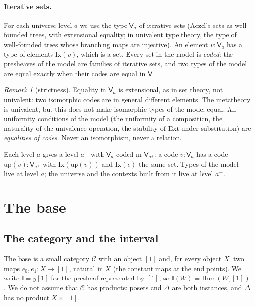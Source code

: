 \documentclass[11pt]{article}
\newcommand{\Hom}{\mathrm{Hom}}
\newcommand{\I}{\mathbb{I}}
\newcommand{\C}{\mathcal{C}}
\newcommand{\V}{\mathsf{V}}
\newcommand{\Ext}{\mathrm{Ext}}
\newcommand{\up}{\mathrm{up}}
\theoremstyle{plain}
\theoremstyle{definition}
\theoremstyle{remark}
\newtheorem{remark}[theorem]{Remark}
\begin{document}
\paragraph{Iterative sets.} For each universe level $a$ we use the type
$\V_a$ of iterative sets (Aczel's sets as well-founded trees, with
extensional equality; in univalent type theory, the type of
well-founded trees whose branching maps are injective). An element
$v:\V_a$ has a type of elements $\mathrm{Ix}(v)$, which is a set. Every
set in the model is \emph{coded}: the presheaves of the model are
families of iterative sets, and two types of the model are equal exactly
when their codes are equal in $\V$.

\begin{remark}[strictness]\label{rem:strict}
Equality in $\V_a$ is extensional, as in set theory, not univalent: two
isomorphic codes are in general different elements. The metatheory is
univalent, but this does not make isomorphic types of the model equal.
All uniformity conditions of the model (the uniformity of a composition,
the naturality of the univalence operation, the stability of $\Ext$ under
substitution) are \emph{equalities of codes}. Never an isomorphism, never
a relation.
\end{remark}

Each level $a$ gives a level $a^+$ with $\V_a$ coded in $\V_{a^+}$: a code
$v:\V_a$ has a code $\up(v):\V_{a^+}$ with $\mathrm{Ix}(\up(v))$ and
$\mathrm{Ix}(v)$ the same set. Types of the model live at level $a$; the
universe and the contexts built from it live at level $a^+$.

\section{The base}\label{sec:base}

\subsection{The category and the interval}

The base is a small category $\C$ with an object $[1]$ and, for every
object $X$, two maps $e_0,e_1:X\to[1]$, natural in $X$ (the constant
maps at the end points). We write $\I=y[1]$ for the presheaf represented
by $[1]$, so $\I(W)=\Hom(W,[1])$. We do not assume that $\C$ has
products: posets and $\Delta$ are both instances, and $\Delta$ has no
product $X\times[1]$.
\end{document}
